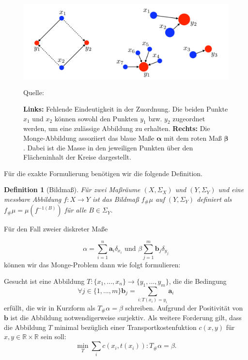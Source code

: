 \documentclass[11pt,a4paper]{article}
\newcommand{\source}[1]{\caption*{\hfill Quelle: {#1}} }
\newtheorem{definition}[theorem]{Definition}
\numberwithin{equation}{section}
\begin{document}
	\begin{figure}[ht]
		\centering
		\includegraphics[width=0.3\textheight]{monge_mapping.png}
		\caption[Monge-Abbildung]{\textbf{Links:} Fehlende Eindeutigkeit in der Zuordnung. Die beiden Punkte $x_1$ und $x_2$ können sowohl den Punkten $y_1$ bzw. $y_2$ zugeordnet werden, um eine zulässige Abbildung zu erhalten. \textbf{Rechts:} Die Monge-Abbildung assoziiert das blaue Maße $\boldsymbol{\alpha}$ mit dem roten Maß $\boldsymbol{\beta}$. Dabei ist die Masse in den jeweiligen Punkten über den Flächeninhalt der Kreise dargestellt.}
		\source{\cite{COTcuturi}}
		\label{im:monge_mapping}
	\end{figure}
	
	Für die exakte Formulierung benötigen wir die folgende Definition.
	
	\begin{definition}[Bildmaß]
		Für zwei Maßräume $(X,\Sigma_X)$ und $(Y,\Sigma_Y)$ und eine messbare Abbildung $f:X\to Y$ ist das Bildmaß $f_\#\mu$ auf $(Y,\Sigma_Y)$ definiert als $f_\#\mu = \mu (f^{-1(B)})$ für alle $B \in \Sigma_Y$.
	\end{definition}
	
	Für den Fall zweier diskreter Maße
	
	\begin{equation}
	\alpha = \sum_{i=1}^n{\boldsymbol{a}_i\delta_{x_i}} \text{ und } \beta \sum_{j=1}^m{\boldsymbol{b}_j\delta_{y_j}}
	\end{equation}
	können wir das Monge-Problem dann wie folgt formulieren:
	
	Gesucht ist eine Abbildung $T:\lbrace x_1, ..., x_n \rbrace \to \lbrace y_1,...,y_m \rbrace$, die die Bedingung 
	\begin{equation}
	\forall j \in \lbrace 1,...,m \rbrace \boldsymbol{b}_j= \sum_{i:T(x_i)=y_i}{\boldsymbol{a}_i}
	\end{equation}
	erfüllt, die wir in Kurzform als $T_\#\alpha = \beta$ schreiben. Aufgrund der Positivität von $\boldsymbol{b}$ ist die Abbildung notwendigerweise surjektiv.
	Als weitere Forderung gilt, dass die Abbildung $T$ minimal bezüglich einer Transportkostenfuktion $c(x,y)$ für $x,y \in \mathbb{R} \times \mathbb{R}$ sein soll:
	\begin{equation}
	\min_T{\sum_i{c(x_i, t(x_i)) : T_\#\alpha =  \beta}}.
	\end{equation} 
	
\end{document}
